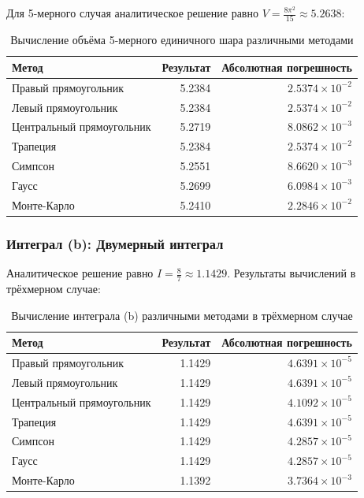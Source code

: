 \documentclass[a4paper]{article}
\begin{document}
Для 5-мерного случая аналитическое решение равно $V = \frac{8\pi^2}{15} \approx 5.2638$:

\begin{table}[H]
\centering
\small
\begin{tabular}{lrr}
\hline
Метод & Результат & Абсолютная погрешность \\
\hline
Правый прямоугольник & 5.2384 & $2.5374 \times 10^{-2}$ \\
Левый прямоугольник & 5.2384 & $2.5374 \times 10^{-2}$ \\
Центральный прямоугольник & 5.2719 & $8.0862 \times 10^{-3}$ \\
Трапеция & 5.2384 & $2.5374 \times 10^{-2}$ \\
Симпсон & 5.2551 & $8.6620 \times 10^{-3}$ \\
Гаусс & 5.2699 & $6.0984 \times 10^{-3}$ \\
Монте-Карло & 5.2410 & $2.2846 \times 10^{-2}$ \\
\hline
\end{tabular}
\caption{Вычисление объёма 5-мерного единичного шара различными методами}
\label{tab:sphere_5d}
\end{table}

\subsubsection*{Интеграл (b): Двумерный интеграл}

Аналитическое решение равно $I = \frac{8}{7} \approx 1.1429$. Результаты вычислений в трёхмерном случае:

\begin{table}[H]
\centering
\small
\begin{tabular}{lrr}
\hline
Метод & Результат & Абсолютная погрешность \\
\hline
Правый прямоугольник & 1.1429 & $4.6391 \times 10^{-5}$ \\
Левый прямоугольник & 1.1429 & $4.6391 \times 10^{-5}$ \\
Центральный прямоугольник & 1.1429 & $4.1092 \times 10^{-5}$ \\
Трапеция & 1.1429 & $4.6391 \times 10^{-5}$ \\
Симпсон & 1.1429 & $4.2857 \times 10^{-5}$ \\
Гаусс & 1.1429 & $4.2857 \times 10^{-5}$ \\
Монте-Карло & 1.1392 & $3.7364 \times 10^{-3}$ \\
\hline
\end{tabular}
\caption{Вычисление интеграла (b) различными методами в трёхмерном случае}
\label{tab:int_b_3d}
\end{table}
\end{document}
